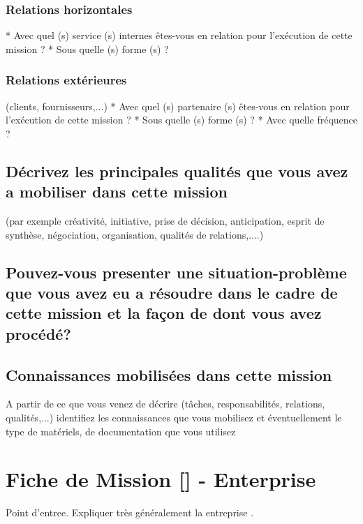 \documentclass{resume} %
\begin{document}
		\subsubsection{Relations horizontales}
* Avec quel (s) service (s) internes êtes-vous en relation pour l'exécution de cette mission ?
* Sous quelle (s) forme (s) ?
		\subsubsection{Relations extérieures} (clients, fournisseurs,...)
* Avec quel (s) partenaire (s) êtes-vous en relation pour l'exécution de cette mission ?
* Sous quelle (s) forme (s) ?
* Avec quelle fréquence ?

	\subsection{Décrivez les principales qualités que vous avez a mobiliser dans cette mission}
(par exemple créativité, initiative, prise de décision, anticipation, esprit de synthèse, négociation, organisation, qualités de relations,....)

	\subsection{Pouvez-vous presenter une situation-problème que vous avez eu a résoudre dans le cadre de cette mission et la façon de dont vous avez procédé?}
	\subsection {Connaissances mobilisées dans cette mission }
A partir de ce que vous venez de décrire (tâches, responsabilités, relations, qualités,...) identifiez les connaissances que vous mobilisez et éventuellement le type de matériels, de documentation que vous utilisez





\section{Fiche de Mission [] - Enterprise }

	Point d'entree. Expliquer très généralement la entreprise .
	
\end{document}
